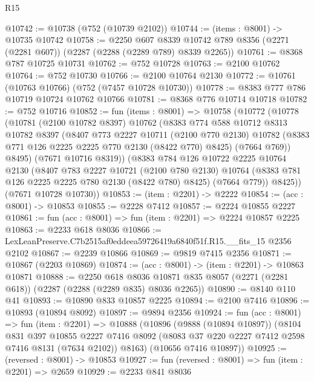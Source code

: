 \begin{lexlean}{R15}
\begin{coremodule}
@10742 := @10738 (@752 (@10739 @2102))
@10744 := (items : @8001) -> @10735 @10742
@10758 := @2250
    @607
    @8339
    @10742
    @789
    @8356
    (@2271 (@2281 @607))
    (@2287 (@2288 (@2289 @789) @8339 @2265))
@10761 := @8368 @787 @10725 @10731
@10762 := @752 @10728
@10763 := @2100 @10762
@10764 := @752 @10730
@10766 := @2100 @10764 @2130
@10772 := @10761 (@10763 @10766) (@752 (@7457 @10728 @10730))
@10778 := @8383 @777 @786 @10719 @10724 @10762 @10766
@10781 := @8368 @776 @10714 @10718
@10782 := @752 @10716
@10852 := fun (items : @8001) =>
  @10758
    (@10772
      (@10778
        (@10781
          (@2100 @10782 @8397)
          @10762
          (@8383
            @774
            @588
            @10712
            @8313
            @10782
            @8397
            (@8407
              @773
              @2227
              @10711
              (@2100 @770 @2130)
              @10782
              (@8383 @771 @126 @2225 @2225 @770 @2130 (@8422 @770) @8425)
              (@7664 @769))
            @8495)
          (@7671 @10716 @8319))
        (@8383
          @784
          @126
          @10722
          @2225
          @10764
          @2130
          (@8407
            @783
            @2227
            @10721
            (@2100 @780 @2130)
            @10764
            (@8383 @781 @126 @2225 @2225 @780 @2130 (@8422 @780) @8425)
            (@7664 @779))
          @8425))
      (@7671 @10728 @10730))
@10853 := (item : @2201) -> @2222
@10854 := (acc : @8001) -> @10853
@10855 := @2228 @7412
@10857 := @2224 @10855 @2227
@10861 := fun (acc : @8001) => fun (item : @2201) => @2224 @10857 @2225
@10863 := @2233 @618 @8036
@10866 := LexLeanPreserve.C7b2515af0eddeea59726419a6840f51f.R15.__fits_15 @2356 @2102
@10867 := @2239 @10866
@10869 := @9819 @7415 @2356
@10871 := @10867 (@2203 @10869)
@10874 := (acc : @8001) -> (item : @2201) -> @10863 @10871
@10888 := @2250
    @618
    @8036
    @10871
    @835
    @8057
    (@2271 (@2281 @618))
    (@2287 (@2288 (@2289 @835) @8036 @2265))
@10890 := @8140 @110 @41
@10893 := @10890 @833 @10857 @2225
@10894 := @2100 @7416
@10896 := @10893 (@10894 @8092)
@10897 := @9894 @2356
@10924 := fun (acc : @8001) =>
  fun (item : @2201) =>
  @10888
    (@10896
      (@9888 (@10894 @10897))
      (@8104
        @831
        @397
        @10855
        @2227
        @7416
        @8092
        (@8083 @37 @220 @2227 @7412 @2598 @7416 @8131 (@7634 @2102))
        @8163)
      (@10656 @7416 @10897))
@10925 := (reversed : @8001) -> @10853
@10927 := fun (reversed : @8001) => fun (item : @2201) => @2659
@10929 := @2233 @841 @8036

\end{coremodule}
\end{lexlean}
